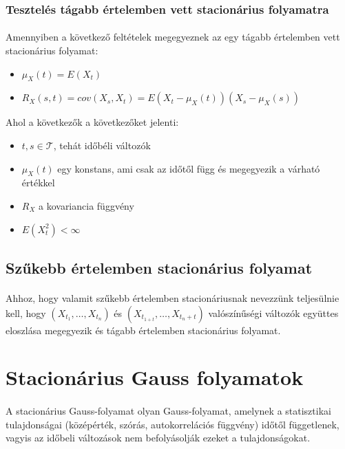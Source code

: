 \documentclass[11pt,a4pape,draftr]{article}
\begin{document}
				\subsubsection{Tesztelés tágabb értelemben vett stacionárius folyamatra}
					\paragraph{}
						Amennyiben a következő feltételek megegyeznek az egy tágabb értelemben vett stacionárius folyamat:
						\begin{itemize}
							\item $\mu_X (t) = E(X_t)$
							\item $R_X(s,t) = cov(X_s, X_t) = E(X_t - \mu_X (t)) (X_s - \mu_X (s))$
						\end{itemize}
						Ahol a következők a következőket jelenti:
						\begin{itemize}
							\item $t, s \in \mathcal{T}$, tehát időbéli változók
							\item $\mu_X (t)$ egy konstans, ami csak az időtől függ és megegyezik a várható értékkel
							\item $R_X$ a kovariancia függvény
							\item $E(X_t^2) < \infty$ 
						\end{itemize}
			\subsection{Szűkebb értelemben stacionárius folyamat}
				\paragraph{}

				Ahhoz, hogy valamit szűkebb értelemben stacionáriusnak nevezzünk teljesülnie kell, hogy $(X_{t_1}, \dots , X_{t_n})$ és $(X_{t_{1+t}}, \dots, X_{t_n + t})$ valószínűségi változók  együttes eloszlása megegyezik és tágabb értelemben stacionárius folyamat.

		\section{Stacionárius Gauss folyamatok}
			\paragraph{}
				A stacionárius Gauss-folyamat olyan Gauss-folyamat, amelynek a statisztikai tulajdonságai (középérték, szórás, autokorrelációs függvény) időtől függetlenek, vagyis az időbeli változások nem befolyásolják ezeket a tulajdonságokat.
\end{document}
